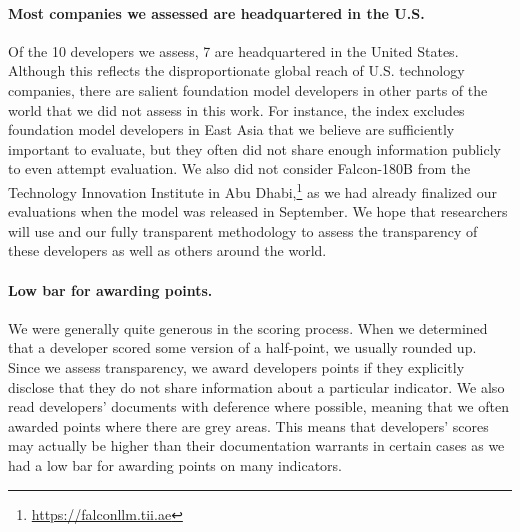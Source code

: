 \paragraph{Most companies we assessed are headquartered in the U.S.}
Of the 10 developers we assess, 7 are headquartered in the United States. 
Although this reflects the disproportionate global reach of U.S. technology companies, there are salient foundation model developers in other parts of the world that we did not assess in this work. 
For instance, the index excludes foundation model developers in East Asia that we believe are sufficiently important to evaluate, but they often did not share enough information publicly to even attempt evaluation.
We also did not consider Falcon-180B from the Technology Innovation Institute in Abu Dhabi,\footnote{\url{https://falconllm.tii.ae}} as we had already finalized our evaluations when the model was released in September. 
We hope that researchers will use \projectname and our fully transparent methodology to assess the transparency of these developers as well as others around the world.

\paragraph{Low bar for awarding points.} 
We were generally quite generous in the scoring process. 
When we determined that a developer scored some version of a half-point, we usually rounded up. 
Since we assess transparency, we award developers points if they explicitly disclose that they do not share information about a particular indicator.
We also read developers' documents with deference where possible, meaning that we often awarded points where there are grey areas.
This means that developers' scores may actually be higher than their documentation warrants in certain cases as we had a low bar for awarding points on many indicators.